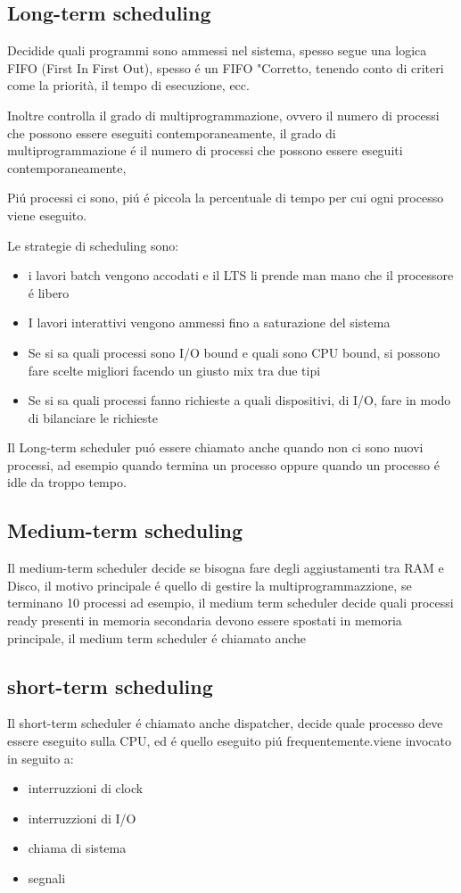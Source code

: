     \subsection{Long-term scheduling}
    Decidide quali programmi sono ammessi nel sistema, spesso segue una logica FIFO (First In First Out),
    spesso é un FIFO "Corretto, tenendo conto di criteri come la priorità, il tempo di esecuzione, ecc.

    Inoltre controlla il grado di multiprogrammazione, ovvero il numero di processi che possono essere eseguiti
    contemporaneamente, il grado di multiprogrammazione é il numero di processi che possono essere eseguiti
    contemporaneamente,

    Piú processi ci sono, piú é piccola la percentuale di tempo per cui ogni processo viene eseguito.

    Le strategie di scheduling sono:
    \begin{itemize}
        \item i lavori batch vengono accodati e il LTS li prende man mano che il processore é libero
        \item I lavori interattivi vengono ammessi fino a saturazione del sistema
        \item Se si sa quali processi sono I/O bound e quali sono CPU bound, si possono fare scelte migliori facendo un giusto mix tra due tipi
        \item Se si sa quali processi fanno richieste a quali dispositivi, di I/O, fare in modo di bilanciare le richieste
    \end{itemize}
    Il Long-term scheduler puó essere chiamato anche quando non ci sono nuovi processi, ad esempio quando termina un processo oppure
    quando un processo é idle da troppo tempo.

    \subsection{Medium-term scheduling}
    Il medium-term scheduler decide se bisogna fare degli aggiustamenti tra RAM e Disco, il motivo principale é quello di gestire
    la multiprogrammazzione, se terminano 10 processi ad esempio, il medium term scheduler decide quali processi ready
    presenti in memoria secondaria devono essere spostati in memoria principale, il medium term scheduler é chiamato anche
    \subsection{short-term scheduling}
    Il short-term scheduler é chiamato anche dispatcher, decide quale processo deve essere eseguito sulla CPU,
    ed é quello eseguito piú frequentemente.viene invocato in seguito a:
    \begin{itemize}
        \item interruzzioni di clock
        \item interruzzioni di I/O
        \item chiama di sistema
        \item segnali
    \end{itemize}

